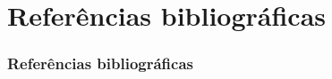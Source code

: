 \documentclass[aspectratio=169]{beamer}
\begin{document}
	\section{Refer\^{e}ncias bibliogr\'{a}ficas}

	\begin{frame}
		\frametitle{Refer\^{e}ncias bibliogr\'{a}ficas}
		
	\end{frame}
\end{document}
